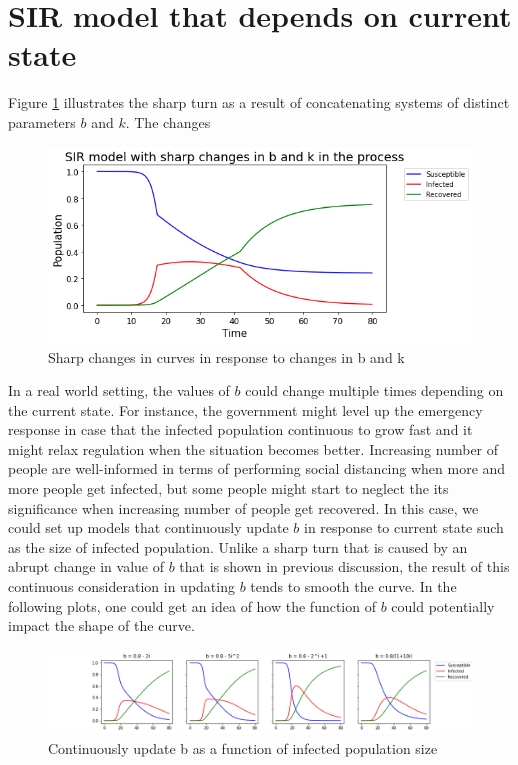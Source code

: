 \documentclass[12pt, reqno]{amsart}
\begin{document}
    \section{SIR model that depends on current state} \label{appendix:sir_continous}
Figure \ref{fig:Sharp} illustrates the sharp turn as a result of concatenating systems of distinct parameters $b$ and $k$. The changes 
\begin{figure}[h]
        \centering
        \includegraphics[scale=0.5]{./current_state_sharp_change.png}
        \caption{Sharp changes in curves  in response to changes in b and k}
        \label{fig:Sharp}
\end{figure}
In a real world setting, the values of $b$ could change multiple times depending on the current state. For instance, the government might level up the emergency response in case that the infected population continuous to grow fast and it might relax regulation when the situation becomes better. Increasing number of people are well-informed in terms of performing social distancing when more and more people get infected, but some people might start to neglect the its significance when increasing number of people get recovered. In this case, we could set up models that continuously update $b$ in response to current state such as the size of infected population. Unlike a sharp turn that is caused by an abrupt change in value of $b$ that is shown in previous discussion, the result of this continuous consideration in updating $b$ tends to smooth the curve. In the following plots, one could get an idea of how the function of $b$ could potentially impact the shape of the curve. 
\begin{figure}[h]
        \centering
        \includegraphics[scale=0.4]{./b_func.png}
        \caption{Continuously update b as a function of infected population size}
        \label{fig:cont} 
\end{figure}
\end{document}
